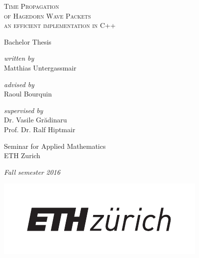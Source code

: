 \begin{titlepage}
	\begin{center}

		\hfill

		\vspace{2cm}

		{\Large \textsc{Time Propagation\\ of Hagedorn Wave Packets\\[5pt]}}
		{\large \textsc{an efficient implementation in C++}}

		\vspace{1cm}

		{\large{Bachelor Thesis}}

		\vspace{1cm}

		{\emph{written by}} \\
		{
			Matthias Untergassmair
		}

		\vspace{1cm}

		{\emph{advised by}} \\
		{
			Raoul Bourquin
		}

		\vspace{1cm}

		{\emph{supervised by}} \\
		{
			Dr. Vasile Gr\u{a}dinaru\\
			Prof. Dr. Ralf Hiptmair
		}
		
		\vfill

		Seminar for Applied Mathematics\\
		ETH Zurich

		\vspace{.5cm}

		\emph{{Fall semester 2016}}

		\vspace{.5cm}

		\includegraphics[width=0.5\linewidth]{figures/eth-logo.pdf}

	\end{center}

\end{titlepage}
